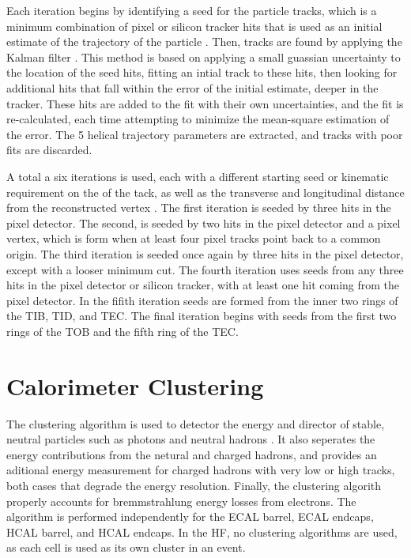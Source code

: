 \par Each iteration begins by identifying a seed for the particle
tracks, which is a minimum combination of pixel or silicon tracker
hits that is used as an initial estimate of the trajectory of the
particle \cite{Chatrchyan:2014fea}.  Then, tracks are found by applying
the Kalman filter \cite{Fruhwirth:1987fm}.  This method is based on
applying a small guassian uncertainty to the location of the seed
hits, fitting an intial track to these hits, then looking for
additional hits that fall within the error of the initial estimate,
deeper in the tracker.  These hits are added to the fit with their own
uncertainties, and the fit is re-calculated, each time attempting to
minimize the mean-square estimation of the error.  The 5 helical
trajectory parameters are extracted, and tracks with poor fits are
discarded.    

\par A total a six iterations is used, each with a different starting
seed or kinematic requirement on the \PT of the tack, as well as
the transverse and longitudinal distance from the reconstructed
vertex \cite{Fruhwirth:1987fm}.  The first iteration is seeded by
three hits in the pixel detector.  The second, is seeded by two hits
in the pixel detector and a pixel vertex, which is form when at least
four pixel tracks point back to a common origin.  The third iteration
is seeded once again by three hits in the pixel detector, except with
a looser minimum \PT cut.  The fourth iteration uses seeds from any
three hits in the pixel detector or silicon tracker, with at least one
hit coming from the pixel detector.  In the fifith iteration seeds are
formed from the inner two rings of the TIB, TID, and TEC.  The final
iteration begins with seeds from the first two rings of the TOB and
the fifth ring of the TEC.   


\section{Calorimeter Clustering}
\label{calorimeter_clustering_overview}

\par The clustering algorithm is used to detector the energy and
director of stable, neutral particles such as photons and neutral
hadrons \cite{CMS-PAS-PFT-09-001}.  It also seperates the energy
contributions from the netural and charged hadrons, and provides an
aditional energy measurement for charged hadrons with very low or high
\PT tracks, both cases that degrade the energy resolution.  Finally,
the clustering algorith properly accounts for bremmstrahlung energy
losses from electrons. The algorithm is performed independently for
the ECAL barrel, ECAL endcaps, HCAL barrel, and HCAL endcaps.  In the
HF, no clustering algorithms are used, as each cell is used as its own
cluster in an event.   

